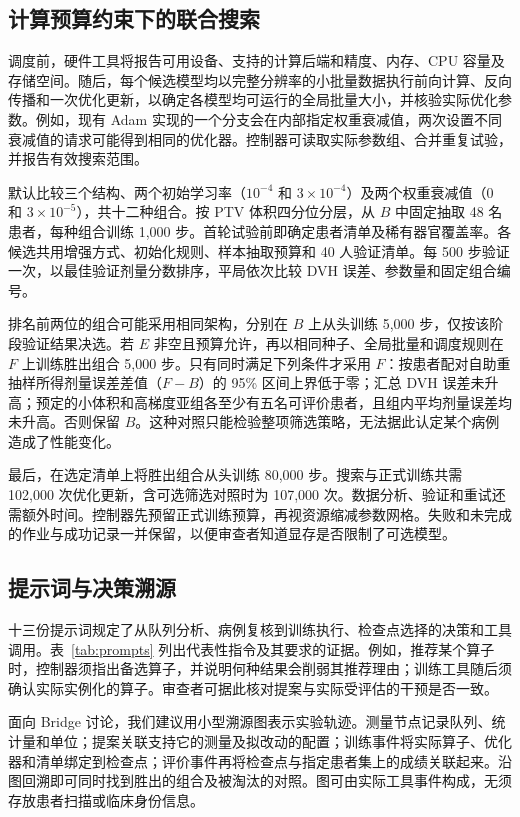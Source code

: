 \documentclass[UTF8,letterpaper,twocolumn,11pt,fontset=fandol]{ctexart}
\begin{document}
\subsection{计算预算约束下的联合搜索}
调度前，硬件工具将报告可用设备、支持的计算后端和精度、内存、CPU 容量及存储空间。随后，每个候选模型均以完整分辨率的小批量数据执行前向计算、反向传播和一次优化更新，以确定各模型均可运行的全局批量大小，并核验实际优化参数。例如，现有 Adam 实现的一个分支会在内部指定权重衰减值，两次设置不同衰减值的请求可能得到相同的优化器。控制器可读取实际参数组、合并重复试验，并报告有效搜索范围。

默认比较三个结构、两个初始学习率（$10^{-4}$ 和 $3\times10^{-4}$）及两个权重衰减值（0 和 $3\times10^{-5}$），共十二种组合。按 PTV 体积四分位分层，从 $B$ 中固定抽取 48 名患者，每种组合训练 1,000 步。首轮试验前即确定患者清单及稀有器官覆盖率。各候选共用增强方式、初始化规则、样本抽取预算和 40 人验证清单。每 500 步验证一次，以最佳验证剂量分数排序，平局依次比较 DVH 误差、参数量和固定组合编号。

排名前两位的组合可能采用相同架构，分别在 $B$ 上从头训练 5,000 步，仅按该阶段验证结果决选。若 $E$ 非空且预算允许，再以相同种子、全局批量和调度规则在 $F$ 上训练胜出组合 5,000 步。只有同时满足下列条件才采用 $F$：按患者配对自助重抽样所得剂量误差差值（$F-B$）的 95\% 区间上界低于零；汇总 DVH 误差未升高；预定的小体积和高梯度亚组各至少有五名可评价患者，且组内平均剂量误差均未升高。否则保留 $B$。这种对照只能检验整项筛选策略，无法据此认定某个病例造成了性能变化。

最后，在选定清单上将胜出组合从头训练 80,000 步。搜索与正式训练共需 102,000 次优化更新，含可选筛选对照时为 107,000 次。数据分析、验证和重试还需额外时间。控制器先预留正式训练预算，再视资源缩减参数网格。失败和未完成的作业与成功记录一并保留，以便审查者知道显存是否限制了可选模型。

\subsection{提示词与决策溯源}
十三份提示词规定了从队列分析、病例复核到训练执行、检查点选择的决策和工具调用。表~\ref{tab:prompts} 列出代表性指令及其要求的证据。例如，推荐某个算子时，控制器须指出备选算子，并说明何种结果会削弱其推荐理由；训练工具随后须确认实际实例化的算子。审查者可据此核对提案与实际受评估的干预是否一致。



面向 Bridge 讨论，我们建议用小型溯源图表示实验轨迹。测量节点记录队列、统计量和单位；提案关联支持它的测量及拟改动的配置；训练事件将实际算子、优化器和清单绑定到检查点；评价事件再将检查点与指定患者集上的成绩关联起来。沿图回溯即可同时找到胜出的组合及被淘汰的对照。图可由实际工具事件构成，无须存放患者扫描或临床身份信息。
\end{document}
